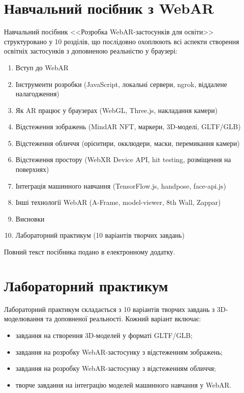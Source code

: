 \section{Навчальний посібник з WebAR}\label{app:textbook}

Навчальний посібник <<Розробка WebAR-застосунків для освіти>> структуровано у 10 розділів, що послідовно охоплюють всі аспекти створення освітніх застосунків з доповненою реальністю у браузері:

\begin{enumerate}
    \item Вступ до WebAR
    \item Інструменти розробки (JavaScript, локальні сервери, ngrok, віддалене налагодження)
    \item Як AR працює у браузерах (WebGL, Three.js, накладання камери)
    \item Відстеження зображень (MindAR NFT, маркери, 3D-моделі, GLTF/GLB)
    \item Відстеження обличчя (орієнтири, окклюдери, маски, перемикання камери)
    \item Відстеження простору (WebXR Device API, hit testing, розміщення на поверхнях)
    \item Інтеграція машинного навчання (TensorFlow.js, handpose, face-api.js)
    \item Інші технології WebAR (A-Frame, model-viewer, 8th Wall, Zappar)
    \item Висновки
    \item Лабораторний практикум (10 варіантів творчих завдань)
\end{enumerate}

Повний текст посібника подано в електронному додатку.

\section{Лабораторний практикум}\label{app:labs}

Лабораторний практикум складається з 10 варіантів творчих завдань з 3D-моделювання та доповненої реальності. Кожний варіант включає:
\begin{itemize}
    \item завдання на створення 3D-моделей у форматі GLTF/GLB;
    \item завдання на розробку WebAR-застосунку з відстеженням зображень;
    \item завдання на розробку WebAR-застосунку з відстеженням обличчя;
    \item творче завдання на інтеграцію моделей машинного навчання у WebAR.
\end{itemize}

